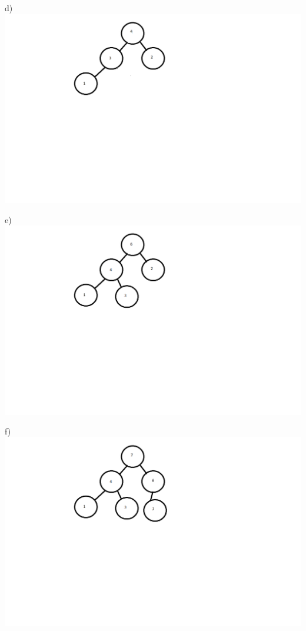 \documentclass[12pt]{article} %
\begin{document}
d)\\
\includegraphics[scale = 0.5]{d.png}

e)\\
\includegraphics[scale =0.5]{e.png}

f)\\
\includegraphics[scale = 0.5]{f.png}
\end{document}
